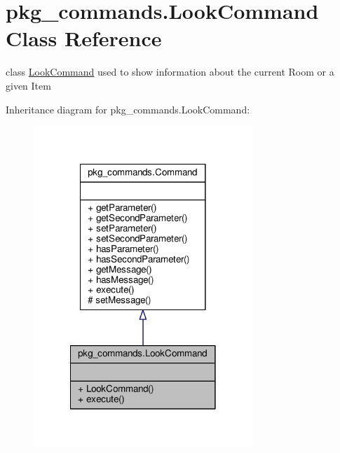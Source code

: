 \hypertarget{classpkg__commands_1_1LookCommand}{\section{pkg\-\_\-commands.\-Look\-Command Class Reference}
\label{classpkg__commands_1_1LookCommand}
}


class \hyperlink{classpkg__commands_1_1LookCommand}{Look\-Command} used to show information about the current Room or a given Item  




Inheritance diagram for pkg\-\_\-commands.\-Look\-Command\-:\nopagebreak
\begin{figure}[H]
\begin{center}
\leavevmode
\includegraphics[width=234pt]{classpkg__commands_1_1LookCommand__inherit__graph}
\end{center}
\end{figure}


